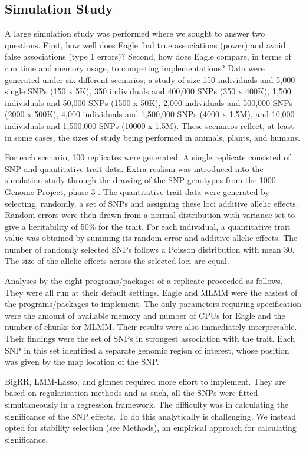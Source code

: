 \documentclass{article}
\begin{document}
 

\subsection{Simulation Study}
A large simulation study was performed where we sought to  answer two questions. 
First, how well does Eagle find true associations (power) and avoid 
false associations (type 1 errors)? Second, how does Eagle compare, in terms of run time and memory usage, to 
competing implementations? Data were generated under six different scenarios; a study of size 150 individuals 
and 5,000 single SNPs (150 x 5K),  350 individuals and 400,000 SNPs (350 x 400K),  1,500 individuals and 
50,000 SNPs (1500 x 50K), 2,000 individuals and 500,000 SNPs (2000 x 500K), 4,000 individuals and 
1,500,000 SNPs (4000 x 1.5M), and 10,000 individuals and 1,500,000 SNPs (10000 x 1.5M).   
These scenarios reflect, at least in some cases, the sizes of study being performed in animals, plants, and humans.  

For each scenario, 100 replicates were generated. A single replicate consisted of SNP and quantitative trait data. 
Extra realism was introduced into the simulation study through the drawing of the SNP genotypes from the 1000 Genome Project, phase 3  \citep{10002010map}.
 The quantitative trait data were generated 
by selecting, randomly, a set of SNPs and assigning these loci additive allelic effects.  Random errors were then drawn from a normal distribution 
with variance set to give a heritability of 50\% for the trait. 
For each individual, a quantitative trait value was obtained by summing its random error and additive allelic effects. 
The number of randomly selected SNPs follows a Poisson distribution with mean 30. The size of the allelic effects 
 across the selected loci are equal.  
 
 Analyses by the eight programs/packages of a replicate proceeded as follows. They were all run at their default settings. 
 Eagle and MLMM were the easiest of the programs/packages to implement. 
 The only parameters requiring specification were the amount of available memory and number of CPUs for 
 Eagle and the number of chunks for MLMM. 
 Their results were also immediately 
 interpretable. Their findings were the set of SNPs in strongest association with the trait. Each 
SNP in this set identified a separate genomic region of interest, whose position was given by the map location of the SNP.  

BigRR, LMM-Lasso, and glmnet required more effort to implement. They are based on regularisation methods and as such, all the SNPs were fitted simultaneously in a regression 
framework. The difficulty was in calculating the significance of the SNP effects. To do this analytically is challenging. We instead opted for stability selection (see Methods),  
an empirical approach for calculating significance. 
\end{document}
